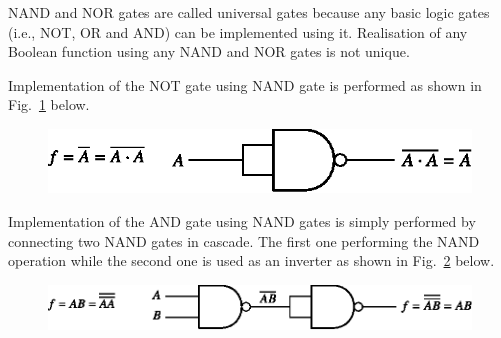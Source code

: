 \begin{solution}
\end{solution}


NAND and NOR gates are called universal gates because any basic logic gates (i.e., NOT, OR and AND) can be implemented using it. Realisation of any Boolean function using any NAND and NOR gates is not unique.


Implementation of the NOT gate using NAND gate is performed as shown in Fig.~\ref{fig5.16} below.
\begin{figure}[H]
\centering
\includegraphics{chap5/fig1.eps}
\caption{}\label{fig5.16}
\end{figure}

Implementation of the AND gate using NAND gates is simply performed by connecting two NAND gates in cascade. The first one performing the NAND operation while the second one is used as an inverter as shown in Fig.~\ref{fig5.17} below.
\begin{figure}[H]
\centering
\includegraphics{chap5/fig2.eps}
\caption{}\label{fig5.17}
\end{figure}

